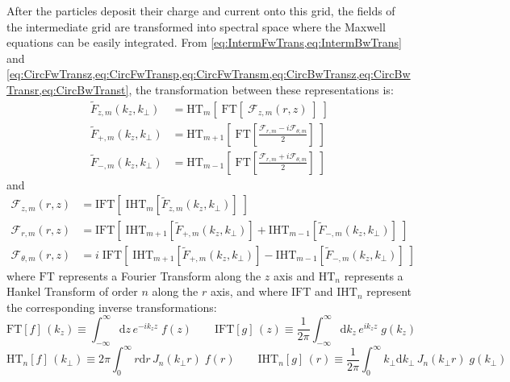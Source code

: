 \documentclass[a4paper]{article}   	%
\newcommand{\Integ}[1]{\int_{-\infty}^{\infty} \!\!\!\!\!
  \mathrm{d}#1}
\newcommand{\RInteg}[1]{\int_{0}^{\infty} \!\!\!\!\! #1\mathrm{d}#1}
\begin{document}
After the particles deposit their charge and current onto this grid,
the fields of the intermediate grid are transformed into spectral
space where the Maxwell equations can be easily integrated. From
\cref{eq:IntermFwTrans,eq:IntermBwTrans} and
\cref{eq:CircFwTransz,eq:CircFwTransp,eq:CircFwTransm,eq:CircBwTransz,eq:CircBwTransr,eq:CircBwTranst}, the transformation between these
representations is:
\begin{align*}
\tilde{F}_{z,m}(k_z,k_\perp) & = \mathrm{HT}_{m} [ \; \mathrm{FT}
                               [ \; \mathcal{F}_{z,m}(r,z) \; ] \;]\\
\tilde{F}_{+,m}(k_z,k_\perp) &= \mathrm{HT}_{m+1}\left[ \; \mathrm{FT} \left[ \frac{
  \mathcal{F}_{r,m} -i  \mathcal{F}_{\theta,m} }{2}  \right] \;\right] \\
\tilde{F}_{-,m}(k_z,k_\perp) &= \mathrm{HT}_{m-1} \left[ \;\mathrm{FT} \left[ \frac{
  \mathcal{F}_{r,m} +i  \mathcal{F}_{\theta,m} }{2}  \right] \;\right] 
\end{align*}
and
\begin{align*}
\mathcal{F}_{z,m}(r,z) &= \mathrm{IFT} [\; \mathrm{IHT}_{m} [
                         \tilde{F}_{z,m}(k_z,k_\perp) ] \; ] \\
\mathcal{F}_{r,m}(r,z) & = \mathrm{IFT} \left[ \; \mathrm{IHT}_{m+1}
                         [ \tilde{F}_{+,m}(k_z,k_\perp) ] + \mathrm{IHT}_{m-1} [
                         \tilde{F}_{-,m}(k_z,k_\perp) ] \; \right] \\
\mathcal{F}_{\theta,m}(r,z) & = i\;\mathrm{IFT} \left[ \; \mathrm{IHT}_{m+1}
                         [ \tilde{F}_{+,m}(k_z,k_\perp) ] - \mathrm{IHT}_{m-1} [ \tilde{F}_{-,m}(k_z,k_\perp) ] \; \right]
\end{align*}
where $\mathrm{FT}$ represents a Fourier Transform along the $z$
axis and $\mathrm{HT}_{n}$ represents a Hankel Transform of order
$n$ along the $r$ axis, and where $\mathrm{IFT}$ and
$\mathrm{IHT}_{n}$ represent the corresponding inverse
transformations:
\[ \mathrm{FT} [f]\, (k_z) \equiv \Integ{z} \, e^{-ik_zz} \; f(z) \qquad 
\mathrm{IFT} [g] \,(z)\equiv \frac{1}{2\pi}\Integ{k_z} \, e^{ik_zz} \;  g(k_z)\]
\[ \mathrm{HT}_{n} [f]\,(k_\perp) \equiv 2\pi \RInteg{r} \,
J_{n}(k_\perp r) \; f(r) \qquad 
\mathrm{IHT}_{n} [g]\,(r) \equiv \frac{1}{2\pi}\RInteg{k_\perp} \,  J_{n}(k_\perp r)  \;  g(k_\perp) \]
\end{document}
